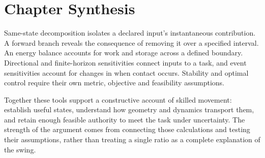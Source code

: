 \section{Chapter Synthesis}
\label{sec:ch7:synthesis}
\label{tab:ch7:summary}
Same-state decomposition isolates a declared input's instantaneous contribution. A forward branch reveals the consequence of removing it over a specified interval. An energy balance accounts for work and storage across a defined boundary. Directional and finite-horizon sensitivities connect inputs to a task, and event sensitivities account for changes in when contact occurs. Stability and optimal control require their own metric, objective and feasibility assumptions.

Together these tools support a constructive account of skilled movement: establish useful states, understand how geometry and dynamics transport them, and retain enough feasible authority to meet the task under uncertainty. The strength of the argument comes from connecting those calculations and testing their assumptions, rather than treating a single ratio as a complete explanation of the swing.

